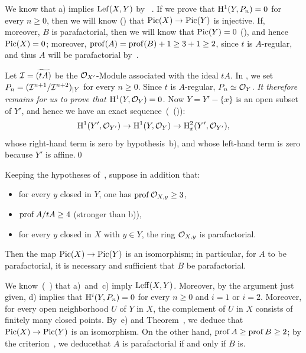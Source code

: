 We know that a) implies $\Lef(X, Y)$ by ~. If we prove that $\H^1(Y, P_n)=0$ for every $n\geq 0$, then we will know  () that $\Pic(X)\to\Pic(Y)$ is injective. If, moreover, $B$ is parafactorial, then we will know that $\Pic(Y)=0$ (), and hence $\Pic(X)=0$; moreover, $\prof(A)=\prof(B)+1\geq 3+1\geq 2$, since $t$ is $A$-regular, and thus $A$ will be parafactorial by~.

Let $\Ii=\widetilde{(tA)}$ be the $\Oo_{X'}$-Module associated with the ideal $tA$. In \numero {}, we set $P_n = \sisi{(\Ii^{n+1}/\Ii^{n+2}){|Y}}{(\Ii^{n+1}/\Ii^{n+2})_{|Y}}$ for every $n\geq 0$. Since $t$ is $A$-regular, $P_n\simeq \Oo_Y$. \emph{It therefore remains for us to prove that $\H^1(Y, \Oo_Y)=0$.} Now $Y = Y'-\{x\}$ is an open subset of $Y'$, and hence we have an exact sequence~(~()):
\[
\H^1(Y', \Oo_{Y'})\to\H^1(Y, \Oo_{Y})\to\H^2_x(Y', \Oo_{Y'}){\quoi},
\]
whose right-hand term is zero by hypothesis~b), and whose left-hand term is zero because $Y'$ is affine.\qed

\begin{lemme} \label{XI.3.17}
Keeping the hypotheses of~, suppose in addition that:
\begin{itemize}
\item[c)] for every $y$ closed in $Y$, one has $\prof\Oo_{X, y}\geq 3$,
\item[d)] $\prof A/tA\geq 4$ (stronger than b)),
\item[e)] for every $y$ closed in $X$ with $y\in Y$, the ring $\Oo_{X, y}$ is parafactorial.
\end{itemize}
Then the map $\Pic(X)\to\Pic(Y)$ is an isomorphism; in particular, for $A$ to be parafactorial, it is necessary and sufficient that $B$ be parafactorial.
\end{lemme}

\enlargethispage{5mm}%
We know~(~) that a)~and~c) imply $\Leff(X, Y)$. Moreover, by the argument just given, d) implies that $\H^i(Y, P_n)=0$ for every $n\geq 0$ and $i=1$ or $i=2$. Moreover, for every open neighborhood $U$ of $Y$ in $X$, the complement of $U$ in $X$ consists of finitely many closed points. By~e) and Theorem~, we deduce that $\Pic(X)\to \Pic(Y)$ is an isomorphism. On the other hand, $\prof A\geq \prof B\geq 2$; by the criterion~, we deduce\pageoriginale that $A$ is parafactorial if and only if $B$ is.


